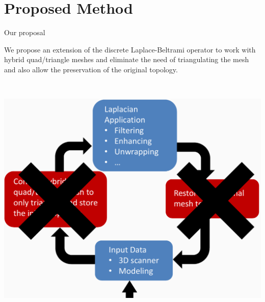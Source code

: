 \documentclass[10pt, compress, english]{beamer}
\begin{document}
\section{Proposed Method}
\begin{frame}{Our proposal}


\begin{minipage}[c]{0.53\columnwidth}%
We propose an extension of the discrete Laplace-Beltrami operator
to work with hybrid quad/triangle meshes and eliminate the need of
triangulating the mesh and also allow the preservation of the original
topology.%
\end{minipage}~~%
\begin{minipage}[c]{0.43\columnwidth}%
\begin{center}
\includegraphics[width=1\columnwidth]{img/Our_Proposal_ModelingProcess}
\par\end{center}%
\end{minipage}


\end{frame}
 
\end{document}
